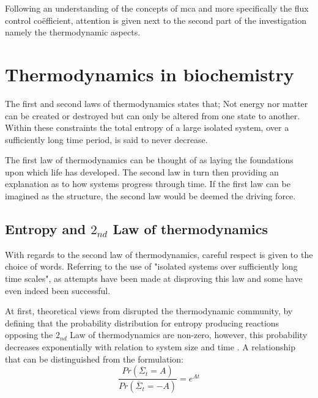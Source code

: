 Following an understanding of the concepts of \gls{mca} and more specifically the flux control co\"efficient, attention is given next to the second part of the investigation namely the thermodynamic aspects.

\section{Thermodynamics in biochemistry}

The first and second laws of thermodynamics states that; Not energy nor matter can be created or destroyed but can only be altered from one state to another. Within these constraints the total entropy of a large isolated system, over a sufficiently long time period, is said to never decrease.

The first law of thermodynamics can be thought of as laying the foundations upon which life has developed. The second law in turn then providing an explanation as to how systems progress through time. If the first law can be imagined as the structure, the second law would be deemed the driving force. 

\subsection{Entropy and $2_{nd}$ Law of thermodynamics}
With regards to the second law of thermodynamics, careful respect is given to the choice of words. Referring to the use of "isolated systems over sufficiently long time scales", as attempts have been made at disproving this law and some have even indeed been successful. 

At first, theoretical views from \citeauthor{Evans1993} disrupted the thermodynamic community, by defining that the probability distribution for entropy producing reactions opposing the $2_{nd}$ Law of thermodynamics are non-zero, however, this probability decreases exponentially with relation to system size and time \cite{Evans1993}. A relationship that can be distinguished from the formulation: $$\frac{Pr\left(\overline{\Sigma}_{t}=A\right)}{Pr\left(\overline{\Sigma}_{t}=-A\right)}=e^{At}$$

